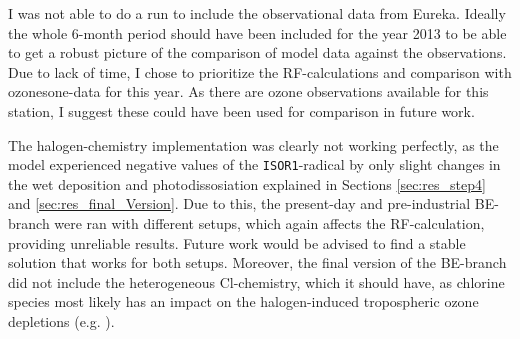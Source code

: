 \medskip
I was not able to do a run to include the observational data from Eureka. Ideally the whole 6-month period should have been included for the year 2013 to be able to get a robust picture of the comparison of model data against the observations. Due to lack of time, I chose to prioritize the RF-calculations and comparison with ozonesone-data for this year. As there are ozone observations available for this station, I suggest these could have been used for comparison in future work. 

\medskip

The halogen-chemistry implementation was clearly not working perfectly, as the model experienced negative values of the \texttt{ISOR1}-radical by only slight changes in the wet deposition and photodissosiation explained in Sections \ref{sec:res_step4} and \ref{sec:res_final_Version}. Due to this, the present-day and pre-industrial BE-branch were ran with different setups, which again affects the RF-calculation, providing unreliable results. Future work would be advised to find a stable solution that works for both setups. Moreover, the final version of the BE-branch did not include the heterogeneous Cl-chemistry, which it should have, as chlorine species most likely has an impact on the halogen-induced tropospheric ozone depletions (e.g. \cite{FinlaysonPitts2010}).